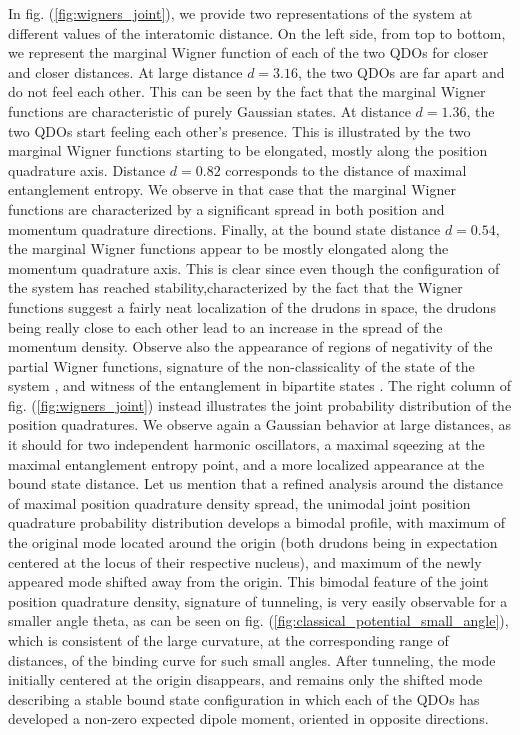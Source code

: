 \documentclass[reprint, amsmath, amssymb, aps, pra]{revtex4-2}
\begin{document}
    In fig. (\ref{fig:wigners_joint}), we provide two representations of the system at different values of the interatomic distance. On the left side, from top to bottom, we represent the marginal Wigner function of each of the two QDOs for closer and closer distances. At large distance $d=3.16$, the two QDOs are far apart and do not feel each other. This can be seen by the fact that the marginal Wigner functions are characteristic of purely Gaussian states. At distance $d=1.36$, the two QDOs start feeling each other's presence. This is illustrated by the two marginal Wigner functions starting to be elongated, mostly along the position quadrature axis. Distance $d=0.82$ corresponds to the distance of maximal entanglement entropy. We observe in that case that the marginal Wigner functions are characterized by a significant spread in both position and momentum quadrature directions. Finally, at the bound state distance $d=0.54$, the marginal Wigner functions appear to be mostly elongated along the momentum quadrature axis. This is clear since even though the configuration of the system has reached stability,characterized by the fact that the Wigner functions suggest a fairly neat localization of the drudons in space, the drudons being really close to each other lead to an increase in the spread of the momentum density. Observe also the appearance of regions of negativity of the partial Wigner functions, signature of the non-classicality of the state of the system \cite{Chabaud:2021pnh}, and witness of the entanglement in bipartite states \cite{arkhipov2018negativity}. The right column of fig. (\ref{fig:wigners_joint}) instead illustrates the joint probability distribution of the position quadratures. We observe again a Gaussian behavior at large distances, as it should for two independent harmonic oscillators, a maximal sqeezing at the maximal entanglement entropy point, and a more localized appearance at the bound state distance. Let us mention that a refined analysis around the distance of maximal position quadrature density spread, the unimodal joint position quadrature probability distribution develops a bimodal profile, with maximum of the original mode located around the origin (both drudons being in expectation centered at the locus of their respective nucleus), and maximum of the newly appeared mode shifted away from the origin. This bimodal feature of the joint position quadrature density, signature of tunneling, is very easily observable for a smaller angle theta, as can be seen on fig. (\ref{fig:classical_potential_small_angle}), which is consistent of the large curvature, at the corresponding range of distances, of the binding curve for such small angles. After tunneling, the mode initially centered at the origin disappears, and remains only the shifted mode describing a stable bound state configuration in which each of the QDOs has developed a non-zero expected dipole moment, oriented in opposite directions.
    \newline
\end{document}
